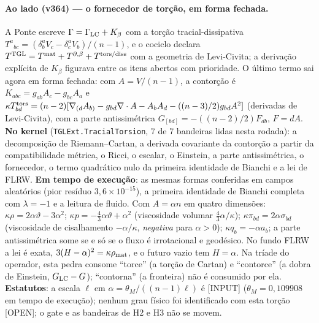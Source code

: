 \documentclass[11pt]{article}
\theoremstyle{definition}\newtheorem{deriv}{Derivação}
\begin{document}
\paragraph*{Ao lado (v364) --- o fornecedor de torção, em forma fechada.} A Ponte escreve $\Gamma=\Gamma_{\rm LC}+K_\beta$ com a torção tracial-dissipativa $T^a{}_{bc}=(\delta^a_bV_c-\delta^a_cV_b)/(n-1)$, e o cociclo declara $T^{\rm TGL}=T^{\rm mat}+T^{\partial,\beta}+T^{\rm tors/diss}$ com a geometria de Levi-Civita; a derivação explícita de $K_\beta$ figurava entre os itens abertos com prioridade. O último termo sai agora em forma fechada: com $A=V/(n-1)$, a contorção é $K_{abc}=g_{ab}A_c-g_{bc}A_a$ e $\kappa T^{\rm tors}_{bd}=(n-2)[\nabla_{(d}A_{b)}-g_{bd}\nabla\cdot A-A_bA_d-((n-3)/2)g_{bd}A^2]$ (derivadas de Levi-Civita), com a parte antissimétrica $G_{[bd]}=-((n-2)/2)F_{db}$, $F=dA$. \textbf{No kernel} (\texttt{TGLExt.TracialTorsion}, 7 de 7 bandeiras lidas nesta rodada): a decomposição de Riemann--Cartan, a derivada covariante da contorção a partir da compatibilidade métrica, o Ricci, o escalar, o Einstein, a parte antissimétrica, o fornecedor, o termo quadrático nulo da primeira identidade de Bianchi e a lei de FLRW. \textbf{Em tempo de execução}: as mesmas formas conferidas em campos aleatórios (pior resíduo $3,6\times10^{-15}$), a primeira identidade de Bianchi completa com $\lambda=-1$ e a leitura de fluido. Com $A=\alpha n$ em quatro dimensões: $\kappa\rho=2\alpha\vartheta-3\alpha^2$; $\kappa p=-\tfrac43\alpha\vartheta+\alpha^2$ (viscosidade volumar $\tfrac43\alpha/\kappa$); $\kappa\pi_{bd}=2\alpha\sigma_{bd}$ (viscosidade de cisalhamento $-\alpha/\kappa$, \emph{negativa} para $\alpha>0$); $\kappa q_b=-\alpha a_b$; a parte antissimétrica some se e só se o fluxo é irrotacional e geodésico. No fundo FLRW a lei é exata, $3(H-\alpha)^2=\kappa\rho_{\rm mat}$, e o futuro vazio tem $H=\alpha$. Na tríade do operador, esta pedra consome ``torce'' (a torção de Cartan) e ``contorce'' (a dobra de Einstein, $G_{\rm LC}-G$); ``contorna'' (a fronteira) não é consumido por ela. \textbf{Estatutos}: a escala $\ell$ em $\alpha=\theta_M/((n-1)\ell)$ é [INPUT] ($\theta_M=0,109908$ em tempo de execução); nenhum grau físico foi identificado com esta torção [OPEN]; o gate e as bandeiras de H2 e H3 não se movem.
\end{document}
